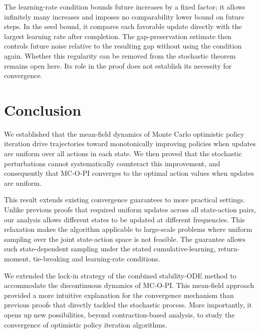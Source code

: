 \documentclass[twoside,11pt]{article}
\DeclareRobustCommand{\reviewbarstart}{%
  \ifhmode %
    \vadjust{\vbox to 0pt{%
      \vskip-\ht\strutbox %
      \vskip-\dp\strutbox %
      \cbstart[\changebarwidth] %
      \vss %
    }}%
  \else %
    \cbstart[\changebarwidth]%
  \fi %
} %
\providecommand{\DIFadd}[1]{#1} %
\providecommand{\DIFaddbegin}{\reviewbarstart} %
\providecommand{\DIFaddend}{\protect\cbend} %
\def\DIFadd#1{#1}%
\def\DIFaddbegin{}%
\def\DIFaddend{}%
\begin{document}
 \DIFaddbegin \DIFadd{The learning-rate condition bounds future increases by a fixed factor; it allows infinitely many increases and imposes no comparability lower bound on future steps}\DIFaddend . \DIFaddbegin \DIFadd{In the seed bound, it compares each favorable update directly with the largest learning rate after completion. The gap-preservation estimate then controls future noise relative to the resulting gap without using the condition again. Whether this regularity can be removed from the stochastic theorem remains open here. Its role in the proof does not establish its necessity for convergence.
}\DIFaddend 

 \section{Conclusion}




We established that the mean-field dynamics of Monte Carlo optimistic policy iteration drive trajectories toward monotonically improving policies when updates are uniform over all actions in each state. 
We then proved that the stochastic perturbations cannot systematically counteract this improvement,
and consequently that MC-O-PI converges to the optimal action values when updates are uniform.


This result extends existing convergence guarantees to more practical settings. Unlike previous proofs that required uniform updates across all state-action pairs, our analysis allows different states to be updated at different frequencies.
This relaxation makes the algorithm applicable to large-scale problems where uniform sampling over the joint state-action space is not feasible.
 \DIFaddbegin \DIFadd{The guarantee allows such state-dependent sampling under the stated cumulative-learning, return-moment, tie-breaking and learning-rate conditions}\DIFaddend .


We extended the lock-in strategy of the combined stability-ODE method to accommodate the discontinuous dynamics of MC-O-PI.
This mean-field approach provided a more intuitive explanation for the convergence mechanism than previous proofs that directly tackled the stochastic process.
More importantly, it opens up new possibilities, beyond contraction-based analysis, to study the convergence of optimistic policy iteration algorithms.
\end{document}
